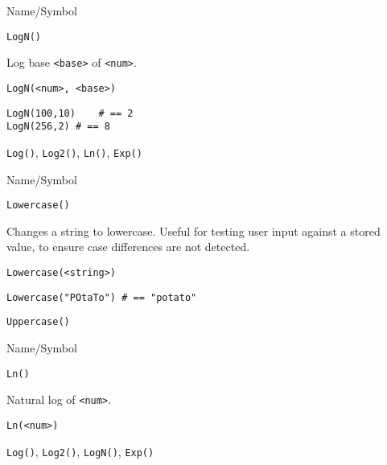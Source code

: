 \rl


\begin{desc}{Name/Symbol}
\item[Name/Symbol]	\verb+LogN()+

\item[Description]	Log base \verb+<base>+ of \verb+<num>+.

\item[Usage]
\begin{verbatim}
LogN(<num>, <base>)
\end{verbatim}

\item[Example]
\begin{verbatim}
LogN(100,10)	# == 2
LogN(256,2)	# == 8
\end{verbatim}

\item[See Also]	\verb+Log()+, \verb+Log2()+, \verb+Ln()+, \verb+Exp()+
\end{desc}

\rl


\begin{desc}{Name/Symbol}
\item[Name/Symbol]	\verb+Lowercase()+

\item[Description]	Changes a string to lowercase.  Useful for testing user
		input against a stored value, to ensure case differences
		are not detected.

\item[Usage]
\begin{verbatim}
Lowercase(<string>)
\end{verbatim}

\item[Example]
\begin{verbatim}
Lowercase("POtaTo")	# == "potato"
\end{verbatim}

\item[See Also]	\verb+Uppercase()+
\end{desc}

\rl


\begin{desc}{Name/Symbol}
\item[Name/Symbol]	\verb+Ln()+

\item[Description]	Natural log of \verb+<num>+.

\item[Usage]		
\begin{verbatim}
Ln(<num>)
\end{verbatim}

\item[Example]	

\item[See Also]	\verb+Log()+, \verb+Log2()+, \verb+LogN()+, \verb+Exp()+     
\end{desc}

